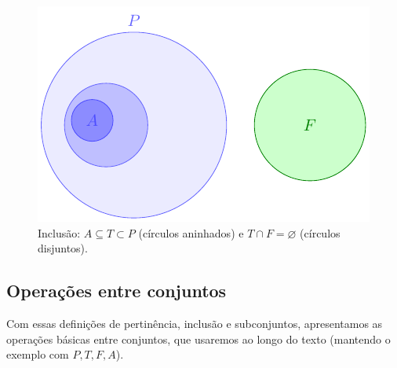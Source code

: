 \begin{figure}[H]
	\centering
	\includegraphics[width=0.9\linewidth]{figures/fig_inclusao.pdf}

	\caption{\texorpdfstring{Inclusão: $A\subseteq T\subset P$ (círculos aninhados) e $T\cap F=\varnothing$ (círculos disjuntos).}{Inclusão: conjuntos aninhados e disjuntos}}
	\label{fig:inclusao}\end{figure}


\subsection{Operações entre conjuntos}

Com essas definições de pertinência, inclusão e subconjuntos, apresentamos as operações básicas entre conjuntos, que usaremos ao longo do texto (mantendo o exemplo com \(P,T,F,A\)).

